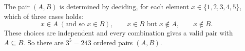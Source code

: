 The pair $(A,B)$ is determined by deciding, for each element $x\in\{1,2,3,4,5\}$, which of three cases holds:
\[x\in A\ (\text{and so } x\in B),\qquad x\in B\text{ but }x\notin A,\qquad x\notin B.\]
These choices are independent and every combination gives a valid pair with $A\subseteq B$. So there are $3^5=\boxed{243}$ ordered pairs $(A,B)$.
